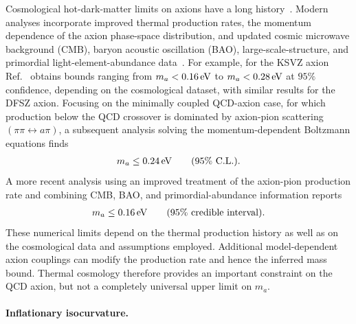 \documentclass[review]{elsarticle}
\numberwithin{equation}{section}
\numberwithin{table}{section}
\numberwithin{figure}{section}
\begin{document}
Cosmological hot-dark-matter limits on axions have a long history~\cite{Hannestad:2005df,Hannestad:2008js}. Modern analyses incorporate improved thermal production rates, the momentum dependence of the axion phase-space distribution, and updated cosmic microwave background (CMB), baryon acoustic oscillation (BAO), large-scale-structure, and primordial light-element-abundance data~\cite{DEramo:2022nvb,Notari:2022ffe,Bianchini:2023ubu}. For example, for the KSVZ axion Ref.~\cite{DEramo:2022nvb} obtains bounds ranging from $m_a<0.16\,{\rm eV}$ to $m_a<0.28\,{\rm eV}$ at $95\%$ confidence, depending on the cosmological dataset, with similar results for the DFSZ axion. Focusing on the minimally coupled QCD-axion case, for which production below the QCD crossover is dominated by axion-pion scattering $(\pi\pi\leftrightarrow a\pi)$, a subsequent analysis solving the momentum-dependent Boltzmann equations finds~\cite{Notari:2022ffe}
\begin{align}
    m_a
    \leq
    0.24\,{\rm eV}
    \qquad
    (95\%~{\rm C.L.}).
\end{align}
A more recent analysis using an improved treatment of the axion-pion production rate and combining CMB, BAO, and primordial-abundance information reports~\cite{Bianchini:2023ubu}
\begin{align}
    m_a
    \leq
    0.16\,{\rm eV}
    \qquad
    (95\%~{\rm credible~interval}).
    \label{eq:thermal-axion-cosmology-bound}
\end{align}
These numerical limits depend on the thermal production history as well as on the cosmological data and assumptions employed. Additional model-dependent axion couplings can modify the production rate and hence the inferred mass bound. Thermal cosmology therefore provides an important constraint on the QCD axion, but not a completely universal upper limit on $m_a$.

\paragraph{Inflationary isocurvature.}
\end{document}
